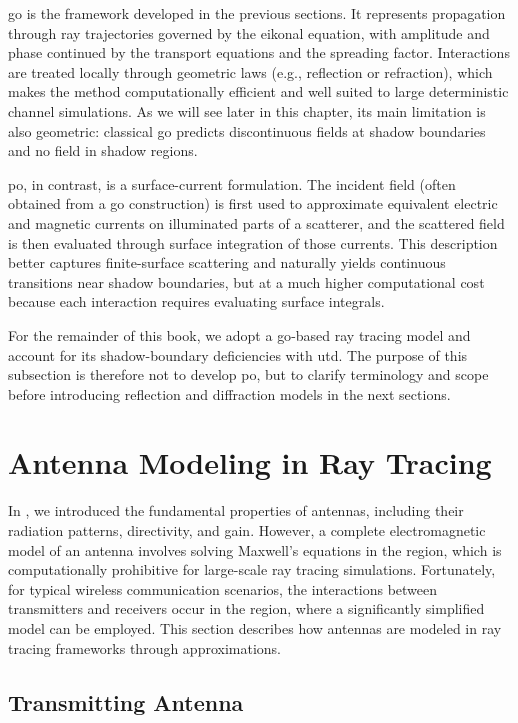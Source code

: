 \gls{go} is the framework developed in the previous sections. It represents propagation through ray trajectories governed by the eikonal equation, with amplitude and phase continued by the transport equations and the spreading factor. Interactions are treated locally through geometric laws (e.g., reflection or refraction), which makes the method computationally efficient and well suited to large deterministic channel simulations. As we will see later in this chapter, its main limitation is also geometric: classical \gls{go} predicts discontinuous fields at shadow boundaries and no field in \glspl{shadow region}.

\gls{po}, in contrast, is a surface-current formulation. The incident field (often obtained from a \gls{go} construction) is first used to approximate equivalent electric and magnetic currents on illuminated parts of a scatterer, and the scattered field is then evaluated through surface integration of those currents. This description better captures finite-surface scattering and naturally yields continuous transitions near shadow boundaries, but at a much higher computational cost because each interaction requires evaluating surface integrals.

For the remainder of this book, we adopt a \gls{go}-based ray tracing model and account for its shadow-boundary deficiencies with \gls{utd}. The purpose of this subsection is therefore not to develop \gls{po}, but to clarify terminology and scope before introducing reflection and diffraction models in the next sections.

\section{Antenna Modeling in Ray Tracing}

In , we introduced the fundamental properties of antennas, including their radiation patterns, directivity, and gain. However, a complete electromagnetic model of an antenna involves solving Maxwell's equations in the  region, which is computationally prohibitive for large-scale ray tracing simulations. Fortunately, for typical wireless communication scenarios, the interactions between transmitters and receivers occur in the  region, where a significantly simplified model can be employed. This section describes how antennas are modeled in ray tracing frameworks through  approximations.

\subsection{Transmitting Antenna}

